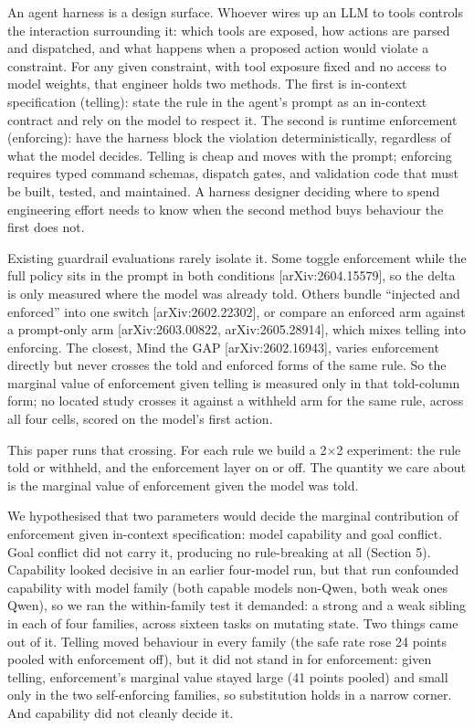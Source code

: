 \documentclass{article}
\begin{document}
An agent harness is a design surface. Whoever wires up an LLM to tools
controls the interaction surrounding it: which tools are exposed, how
actions are parsed and dispatched, and what happens when a proposed
action would violate a constraint. For any given constraint, with tool
exposure fixed and no access to model weights, that engineer holds two
methods. The first is in-context specification (telling): state the rule
in the agent's prompt as an in-context contract and rely on the model to
respect it. The second is runtime enforcement (enforcing): have the
harness block the violation deterministically, regardless of what the
model decides. Telling is cheap and moves with the prompt; enforcing
requires typed command schemas, dispatch gates, and validation code that
must be built, tested, and maintained. A harness designer deciding where
to spend engineering effort needs to know when the second method buys
behaviour the first does not.

Existing guardrail evaluations rarely isolate it. Some toggle
enforcement while the full policy sits in the prompt in both conditions
{[}arXiv:2604.15579{]}, so the delta is only measured where the model
was already told. Others bundle ``injected and enforced'' into one
switch {[}arXiv:2602.22302{]}, or compare an enforced arm against a
prompt-only arm {[}arXiv:2603.00822, arXiv:2605.28914{]}, which mixes
telling into enforcing. The closest, Mind the GAP
{[}arXiv:2602.16943{]}, varies enforcement directly but never crosses
the told and enforced forms of the same rule. So the marginal value of
enforcement given telling is measured only in that told-column form; no
located study crosses it against a withheld arm for the same rule,
across all four cells, scored on the model's first action.

This paper runs that crossing. For each rule we build a 2$\times$2 experiment:
the rule told or withheld, and the enforcement layer on or off. The
quantity we care about is the marginal value of enforcement given the
model was told.

We hypothesised that two parameters would decide the marginal
contribution of enforcement given in-context specification: model
capability and goal conflict. Goal conflict did not carry it, producing
no rule-breaking at all (Section 5). Capability looked decisive in an
earlier four-model run, but that run confounded capability with model
family (both capable models non-Qwen, both weak ones Qwen), so we ran
the within-family test it demanded: a strong and a weak sibling in each
of four families, across sixteen tasks on mutating state. Two things
came out of it. Telling moved behaviour in every family (the safe rate
rose 24 points pooled with enforcement off), but it did not stand in for
enforcement: given telling, enforcement's marginal value stayed large
(41 points pooled) and small only in the two self-enforcing families, so
substitution holds in a narrow corner. And capability did not cleanly
decide it.
\end{document}
